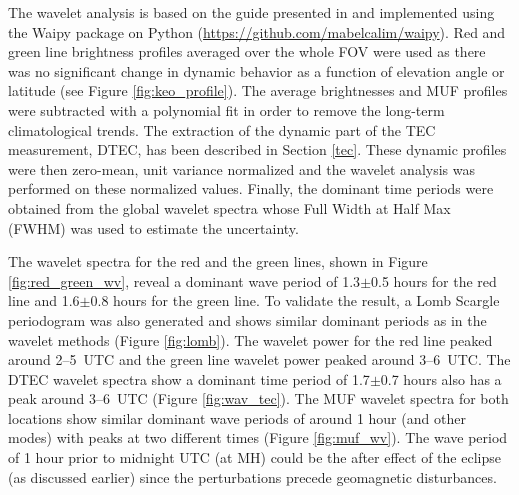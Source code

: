 \documentclass[crop=false,class=mitthesis,oneside,font=12pt]{standalone}
\begin{document}
The wavelet analysis is based on the guide presented in \citet{torrence_wavelet} and implemented using the Waipy package on Python (\url{https://github.com/mabelcalim/waipy}). Red and green line brightness profiles averaged over the whole FOV were used as there was no significant change in dynamic behavior as a function of elevation angle or latitude (see Figure \ref{fig:keo_profile}). 
The average brightnesses and MUF profiles were subtracted with a polynomial fit in order to remove the long-term climatological trends. The extraction of the dynamic part of the TEC measurement, DTEC, has been described in Section \ref{tec}. These dynamic profiles were then zero-mean, unit variance normalized and the wavelet analysis was performed on these normalized values. Finally, the dominant time periods were obtained from the global wavelet spectra whose Full Width at Half Max (FWHM) was used to estimate the uncertainty.

The wavelet spectra for the red and the green lines, shown in Figure \ref{fig:red_green_wv}, reveal a dominant wave period of 1.3$\pm$0.5 hours for the red line and 1.6$\pm$0.8 hours for the green line. To validate the result, a Lomb Scargle periodogram was also generated and shows similar dominant periods as in the wavelet methods (Figure \ref{fig:lomb}). The wavelet power for the red line peaked around 2--5~UTC and the green line wavelet power peaked around 3--6~UTC. The DTEC wavelet spectra show a dominant time period of 1.7$\pm$0.7 hours also has a peak around 3--6~UTC (Figure \ref{fig:wav_tec}). The MUF wavelet spectra for both locations show similar dominant wave periods of around 1 hour (and other modes) with peaks at two different times (Figure \ref{fig:muf_wv}). The wave period of 1 hour prior to midnight UTC (at MH) could be the after effect of the eclipse (as discussed earlier) since the perturbations precede geomagnetic disturbances.  
\end{document}

